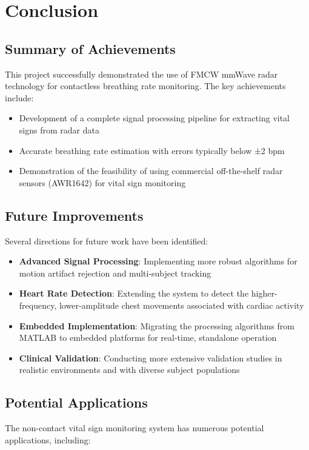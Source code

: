 \documentclass[12pt]{article}
\begin{document}
\section{Conclusion}

\subsection{Summary of Achievements}
This project successfully demonstrated the use of FMCW mmWave radar technology for contactless breathing rate monitoring. The key achievements include:

\begin{itemize}
    \item Development of a complete signal processing pipeline for extracting vital signs from radar data
    \item Accurate breathing rate estimation with errors typically below ±2 bpm
    \item Demonstration of the feasibility of using commercial off-the-shelf radar sensors (AWR1642) for vital sign monitoring
\end{itemize}

\subsection{Future Improvements}
Several directions for future work have been identified:

\begin{itemize}
    \item \textbf{Advanced Signal Processing}: Implementing more robust algorithms for motion artifact rejection and multi-subject tracking
    
    \item \textbf{Heart Rate Detection}: Extending the system to detect the higher-frequency, lower-amplitude chest movements associated with cardiac activity
    
    \item \textbf{Embedded Implementation}: Migrating the processing algorithms from MATLAB to embedded platforms for real-time, standalone operation
    
    \item \textbf{Clinical Validation}: Conducting more extensive validation studies in realistic environments and with diverse subject populations
\end{itemize}

\subsection{Potential Applications}
The non-contact vital sign monitoring system has numerous potential applications, including:
\end{document}
